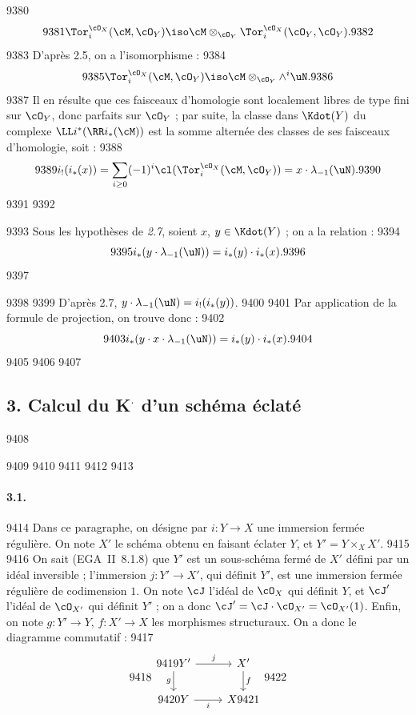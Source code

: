   9380	\[
  9381	\Tor_i^{\cO_X}(\cM, \cO_Y) \iso \cM \otimes_{\cO_Y} \Tor_i^{\cO_X}(\cO_Y, \cO_Y).
  9382	\]
  9383	D'apr\`es 2.5, on a l'isomorphisme :
  9384	\[
  9385	\Tor_i^{\cO_X}(\cM, \cO_Y) \iso \cM \otimes_{\cO_Y} \wedge^i \uN.
  9386	\]
  9387	Il en r\'esulte que ces faisceaux d'homologie sont localement libres de type fini sur $\cO_Y$, donc parfaits sur $\cO_Y$ ; par suite, la classe dans $\Kdot(Y)$ du complexe $\LL i^{*}(\RR i_{*}(\cM))$ est la somme altern\'ee des classes de ses faisceaux d'homologie, soit :
  9388	\[
  9389	i_{!}(i_{*}(x)) = \sum_{i \geq 0} (-1)^i \cl(\Tor_i^{\cO_X}(\cM, \cO_Y)) = x \cdot \lambda_{-1}(\uN).
  9390	\]
  9391	
  9392	\begin{corollaire}[2.8]
  9393	Sous les hypoth\`eses de \emph{2.7}, soient $x$, $y \in \Kdot(Y)$ ; on a la relation :
  9394	\[
  9395	i_{*}(y \cdot \lambda_{-1}(\uN)) = i_{*}(y) \cdot i_{*}(x).
  9396	\]
  9397	\end{corollaire}
  9398	
  9399	D'apr\`es 2.7, $y \cdot \lambda_{-1}(\uN) = i_{!}(i_{*}(y))$.
  9400	
  9401	Par application de la formule de projection, on trouve donc :
  9402	\[
  9403	i_{*}(y \cdot x \cdot \lambda_{-1}(\uN)) = i_{*}(y) \cdot i_{*}(x).
  9404	\]
  9405	
  9406	%
  9407	\subsection*{3. Calcul du K$^{\boldsymbol{\cdot}}$ d'un sch\'ema \'eclat\'e}
  9408	
  9409	
  9410	\setcounter{section}{3}
  9411	\setcounter{subsection}{0}
  9412	
  9413	\paragraph{3.1.}
  9414	Dans ce paragraphe, on d\'esigne par $i: Y \to X$ une immersion ferm\'ee r\'eguli\`ere. On note $X'$ le sch\'ema obtenu en faisant \'eclater $Y$, et $Y' = Y \times_X X'$.
  9415	
  9416	On sait (EGA~II~8.1.8) que $Y'$ est un sous-sch\'ema ferm\'e de $X'$ d\'efini par un id\'eal inversible ; l'immersion $j: Y' \to X'$, qui d\'efinit $Y'$, est une immersion ferm\'ee r\'eguli\`ere de codimension $1$. On note $\cJ$ l'id\'eal de $\cO_X$ qui d\'efinit $Y$, et $\cJ'$ l'id\'eal de $\cO_{X'}$ qui d\'efinit $Y'$ ; on a donc $\cJ' = \cJ \cdot \cO_{X'} = \cO_{X'}(1)$. Enfin, on note $g: Y' \to Y$, $f: X' \to X$ les morphismes structuraux. On a donc le diagramme commutatif :
  9417	\[
  9418	\begin{tikzcd}
  9419	Y' \arrow[r,"j"] \arrow[d,"g"'] & X' \arrow[d,"f"] \\
  9420	Y \arrow[r,"i"'] & X
  9421	\end{tikzcd}
  9422	\]
